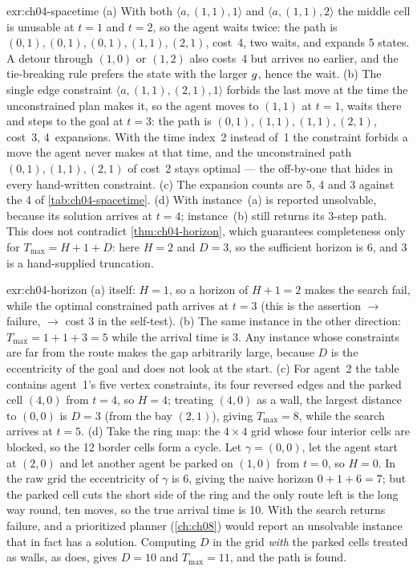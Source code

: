 \begin{solution}{exr:ch04-spacetime}
(a) With both $\langle a,(1,1),1\rangle$ and $\langle a,(1,1),2\rangle$ the middle cell is unusable at $t=1$ and $t=2$, so the agent waits twice: the path is $(0,1),(0,1),(0,1),(1,1),(2,1)$, cost~4, two waits, and  expands 5 states. A detour through $(1,0)$ or $(1,2)$ also costs~4 but arrives no earlier, and the tie-breaking rule prefers the state with the larger $g$, hence the wait. (b) The single edge constraint $\langle a,(1,1),(2,1),1\rangle$ forbids the last move at the time the unconstrained plan makes it, so the agent moves to $(1,1)$ at $t=1$, waits there and steps to the goal at $t=3$: the path is $(0,1),(1,1),(1,1),(2,1)$, cost~3, 4~expansions. With the time index~2 instead of~1 the constraint forbids a move the agent never makes at that time, and the unconstrained path $(0,1),(1,1),(2,1)$ of cost~2 stays optimal --- the off-by-one that hides in every hand-written constraint. (c) The expansion counts are 5, 4 and 3 against the 4 of \cref{tab:ch04-spacetime}. (d) With  instance~(a) is reported unsolvable, because its solution arrives at $t=4$; instance~(b) still returns its 3-step path. This does not contradict \cref{thm:ch04-horizon}, which guarantees completeness only for $T_{\max}=H+1+D$: here $H=2$ and $D=3$, so the sufficient horizon is 6, and 3 is a hand-supplied truncation.
\end{solution}

\begin{solution}{exr:ch04-horizon}
(a)  itself: $H=1$, so a horizon of $H+1=2$ makes the search fail, while the optimal constrained path arrives at $t=3$ (this is the assertion  $\to$ failure,  $\to$ cost 3 in the self-test). (b) The same instance in the other direction: $T_{\max}=1+1+3=5$ while the arrival time is 3. Any instance whose constraints are far from the route makes the gap arbitrarily large, because $D$ is the eccentricity of the goal and does not look at the start. (c) For agent~2 the table contains agent~1's five vertex constraints, its four reversed edges and the parked cell $(4,0)$ from $t=4$, so $H=4$; treating $(4,0)$ as a wall, the largest distance to $(0,0)$ is $D=3$ (from the bay $(2,1)$), giving $T_{\max}=8$, while the search arrives at $t=5$. (d) Take the ring map: the $4\times4$ grid whose four interior cells are blocked, so the 12 border cells form a cycle. Let $\gamma=(0,0)$, let the agent start at $(2,0)$ and let another agent be parked on $(1,0)$ from $t=0$, so $H=0$. In the raw grid the eccentricity of $\gamma$ is 6, giving the naive horizon $0+1+6=7$; but the parked cell cuts the short side of the ring and the only route left is the long way round, ten moves, so the true arrival time is 10. With  the search returns failure, and a prioritized planner (\cref{ch:ch08}) would report an unsolvable instance that in fact has a solution. Computing $D$ in the grid \emph{with} the parked cells treated as walls, as  does, gives $D=10$ and $T_{\max}=11$, and the path is found.
\end{solution}
